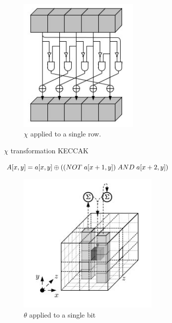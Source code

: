   \begin{figure}
    \begin{center}
      \includegraphics[width=2.3in]{keccakchi.jpg}
    \end{center}
    \caption{$\chi$ applied to a single row.\cite{00015}}
    \label{fig:lab}
  \end{figure}

  \begin{algorithm}
    \caption{ $\chi$ transformation KECCAK\cite{00015}}
    \begin{algorithmic}[1]
      \State {}
      \State {}
      $A[x, y] = a[x, y] \oplus ((NOT \thickspace a[x + 1, y]) \thickspace AND \thickspace a[x + 2, y])$
      \State \EndFor
      \State \EndFor
    \end{algorithmic}
  \end{algorithm}
  
  \begin{figure}
    \begin{center}
      \includegraphics[width=2.7in]{keccaktheta.jpg}
    \end{center}
    \caption{$\theta$ applied to a single bit\cite{00015}}
    \label{fig:lab}
  \end{figure}

